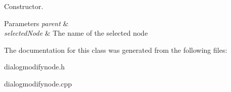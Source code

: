Constructor. 


\begin{DoxyParams}{Parameters}
{\em parent} & \\
\hline
{\em selected\-Node} & The name of the selected node \\
\hline
\end{DoxyParams}


The documentation for this class was generated from the following files\-:\begin{DoxyCompactItemize}
\item 
dialogmodifynode.\-h\item 
dialogmodifynode.\-cpp\end{DoxyCompactItemize}
